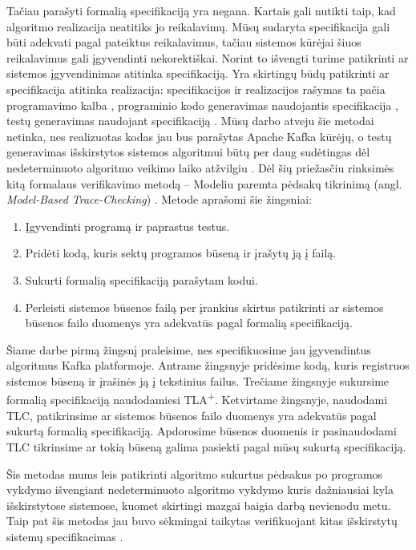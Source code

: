 \documentclass{VUMIFPSmagistrinis}
\begin{document}
		Tačiau parašyti formalią specifikaciją yra negana.
		Kartais gali nutikti taip, kad algoritmo realizacija neatitiks jo reikalavimų.
		Mūsų sudaryta specifikacija gali būti adekvati pagal pateiktus reikalavimus, tačiau sistemos kūrėjai šiuos reikalavimus gali įgyvendinti nekorektiškai.
		Norint to išvengti turime patikrinti ar sistemos įgyvendinimas atitinka specifikaciją.
		Yra skirtingų būdų patikrinti ar specifikacija atitinka realizacija: specifikacijos ir realizacijos rašymas ta pačia programavimo kalba \cite{kern1999formal}, programinio kodo generavimas naudojantis specifikacija \cite{houhou2017framework}, testų generavimas naudojant specifikaciją \cite{utting2010practical}.
		Mūsų darbo atveju šie metodai netinka, nes realizuotas kodas jau bus parašytas Apache Kafka kūrėjų, o testų generavimas išskirstytos sistemos algoritmui būtų per daug sudėtingas dėl nedeterminuoto algoritmo veikimo laiko atžvilgiu \cite{davis2020extreme}.
		Dėl šių priežasčiu rinksimės kitą formalaus verifikavimo metodą -- Modeliu paremta pėdsakų tikrinimą (angl. {\it Model-Based Trace-Checking}) \cite{howard2011modelbased}.
		Metode aprašomi šie žingsniai:
		\begin{enumerate}
			\item{Įgyvendinti programą ir paprastus testus.}
			\item{Pridėti kodą, kuris sektų programos būseną ir įrašytų ją į failą.}
			\item{Sukurti formalią specifikaciją parašytam kodui.}
			\item{Perleisti sistemos būsenos failą per įrankius skirtus patikrinti ar sistemos būsenos failo duomenys yra adekvatūs pagal formalią specifikaciją.}
		\end{enumerate}

		Šiame darbe pirmą žingsnį praleisime, nes specifikuosime jau įgyvendintus algoritmus Kafka platformoje.
		Antrame žingsnyje pridėsime kodą, kuris registruos sistemos būseną ir įrašinės ją į tekstinius failus.
		Trečiame žingsnyje sukursime formalią specifikaciją naudodamiesi TLA\textsuperscript{+}.
		Ketvirtame žingsnyje, naudodami TLC, patikrinsime ar sistemos būsenos failo duomenys yra adekvatūs pagal sukurtą formalią specifikaciją. 
		Apdorosime būsenos duomenis ir pasinaudodami TLC tikrinsime ar tokią būseną galima pasiekti pagal mūsų sukurtą specifikaciją.

		Šis metodas mums leis patikrinti algoritmo sukurtus pėdsakus po programos vykdymo išvengiant nedeterminuoto algoritmo vykdymo kuris dažniausiai kyla išskirstytose sistemose, kuomet skirtingi mazgai baigia darbą nevienodu metu.
		Taip pat šis metodas jau buvo sėkmingai taikytas verifikuojant kitas išskirstytų sistemų specifikacimas \cite{davis2020extreme}.
\end{document}
